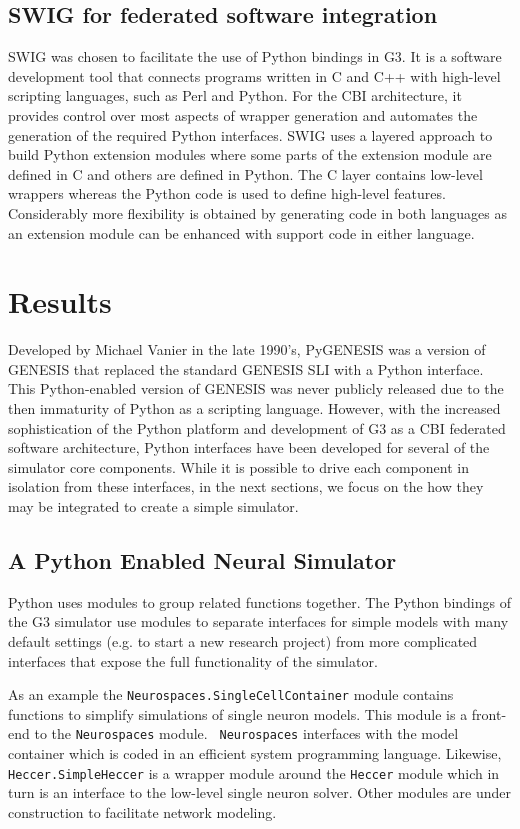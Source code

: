 \documentclass[12pt]{article}
\begin{document}
\subsection{SWIG for federated software integration}

SWIG was chosen to facilitate the use of Python bindings in G3. It is
a software development tool that connects programs written in C and
C++ with high-level scripting languages, such as Perl and Python. For
the CBI architecture, it provides control over most aspects of wrapper
generation and automates the generation of the required Python
interfaces. SWIG uses a layered approach to build Python extension
modules where some parts of the extension module are defined in C and
others are defined in Python. The C layer contains low-level wrappers
whereas the Python code is used to define high-level features.
Considerably more flexibility is obtained by generating code in both
languages as an extension module can be enhanced with support code in
either language.

\section{Results}

Developed by Michael Vanier in the late 1990's, PyGENESIS was a
version of GENESIS that replaced the standard GENESIS SLI with a
Python interface. This Python-enabled version of GENESIS was never
publicly released due to the then immaturity of Python as a scripting
language.  However, with the increased sophistication of the Python
platform and development of G3 as a CBI federated software
architecture, Python interfaces have been developed for several of the
simulator core components.  While it is possible to drive each
component in isolation from these interfaces, in the next sections, we
focus on the how they may be integrated to create a simple simulator.

\subsection{A Python Enabled Neural Simulator}

Python uses modules to group related functions together.  The Python
bindings of the G3 simulator use modules to separate interfaces for
simple models with many default settings (e.g. to start a new research
project) from more complicated interfaces that expose the full
functionality of the simulator.

As an example the {\tt Neurospaces.SingleCellContainer} module
contains functions to simplify simulations of single neuron models.
This module is a front-end to the {\tt Neurospaces} module.  {\tt
  Neurospaces} interfaces with the model container which is coded in
an efficient system programming language.  Likewise, {\tt
  Heccer.SimpleHeccer} is a wrapper module around the {\tt Heccer}
module which in turn is an interface to the low-level single neuron
solver.  Other modules are under construction to facilitate network
modeling.
\end{document}
